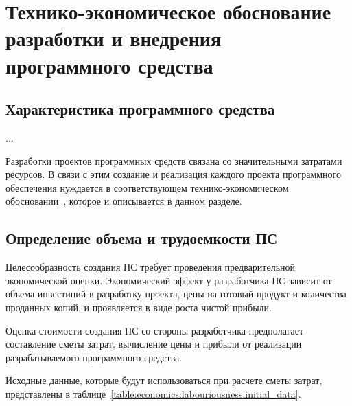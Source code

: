 


\section{Технико-экономическое обоснование разработки и внедрения программного средства}
\label{sec:economics}

\subsection{Характеристика программного средства}
\label{sec:economics:description}

...

Разработки проектов программных средств связана со значительными затратами ресурсов. В связи с этим создание и реализация каждого проекта программного обеспечения нуждается в
соответствующем технико-эко\-но\-ми\-чес\-ком обосновании~\cite{palitsyn}, которое и описывается в данном разделе.

\subsection{Определение объема и трудоемкости ПС}
\label{sec:economics:labouriousness}

Целесообразность создания ПС требует проведения предварительной экономической оценки. Эко\-но\-ми\-чес\-кий эффект у разработчика ПС зависит от объема инвестиций в разработку проекта, цены на готовый продукт и количества проданных копий, и проявляется в виде роста чистой прибыли.

Оценка стоимости создания ПС со стороны разработчика предполагает составление сметы затрат, вычисление цены и прибыли от реализации разрабатываемого программного средства.

Исходные данные, которые будут использоваться при расчете сметы затрат, представлены в таблице~\ref{table:economics:labouriousness:initial_data}.

